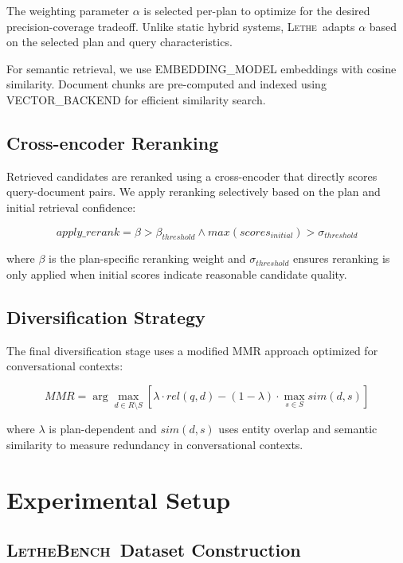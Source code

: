 \documentclass[letterpaper]{article}
\newcommand{\lethe}{\textsc{Lethe}}
\newcommand{\lethebench}{\textsc{LetheBench}}
\begin{document}
The weighting parameter $\alpha$ is selected per-plan to optimize for the desired precision-coverage tradeoff. Unlike static hybrid systems, \lethe\ adapts $\alpha$ based on the selected plan and query characteristics.

For semantic retrieval, we use {{EMBEDDING_MODEL}} embeddings with cosine similarity. Document chunks are pre-computed and indexed using {{VECTOR_BACKEND}} for efficient similarity search.

\subsection{Cross-encoder Reranking}

Retrieved candidates are reranked using a cross-encoder that directly scores query-document pairs. We apply reranking selectively based on the plan and initial retrieval confidence:

\begin{equation}
apply\_rerank = \beta > \beta_{threshold} \land max(scores_{initial}) > \sigma_{threshold}
\end{equation}

where $\beta$ is the plan-specific reranking weight and $\sigma_{threshold}$ ensures reranking is only applied when initial scores indicate reasonable candidate quality.

\subsection{Diversification Strategy}

The final diversification stage uses a modified MMR approach optimized for conversational contexts:

\begin{equation}
MMR = \arg\max_{d \in R \setminus S} [\lambda \cdot rel(q, d) - (1 - \lambda) \cdot \max_{s \in S} sim(d, s)]
\end{equation}

where $\lambda$ is plan-dependent and $sim(d, s)$ uses entity overlap and semantic similarity to measure redundancy in conversational contexts.

\section{Experimental Setup}

\subsection{\lethebench\ Dataset Construction}
\end{document}
